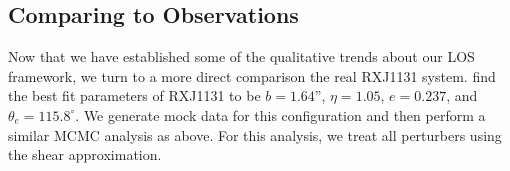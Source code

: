 \subsection{Comparing to Observations} \label{sec:observations}
Now that we have established some of the qualitative trends about our LOS framework, we turn to a more direct comparison the real RXJ1131 system. \citet{Suyu13} find the best fit parameters of RXJ1131 to be $b = 1.64$'', $\eta = 1.05$, $e = 0.237$, and $\theta_e = 115.8^{\circ}$. We generate mock data for this configuration and then perform a similar MCMC analysis as above. For this analysis, we treat all perturbers using the shear approximation.